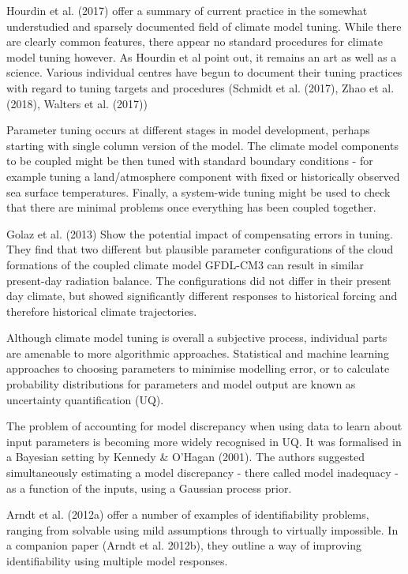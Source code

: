 \documentclass[gmd, manuscript]{copernicus}
\begin{document}
Hourdin et al. (2017) offer a summary of current practice in the somewhat understudied and sparsely documented field of climate model tuning. While there are clearly common features, there appear no standard procedures for climate model tuning however. As Hourdin et al point out, it remains an art as well as a science. Various individual centres have begun to document their tuning practices with regard to tuning targets and procedures (Schmidt et al. (2017), Zhao et al. (2018), Walters et al. (2017))

Parameter tuning occurs at different stages in model development, perhaps starting with single column version of the model. The climate model components to be coupled might be then tuned with standard boundary conditions - for example tuning a land/atmosphere component with fixed or historically observed sea surface temperatures. Finally, a system-wide tuning might be used to check  that there are minimal  problems once everything has been coupled together. 

Golaz et al. (2013) Show the potential impact of compensating errors in tuning. They find that two different but plausible parameter configurations of the cloud formations of the coupled climate model GFDL-CM3 can result in similar present-day radiation balance. The configurations did not differ in their present day climate, but showed significantly different responses to historical forcing and therefore historical climate trajectories.

Although climate model tuning is overall a subjective process, individual parts are amenable to more algorithmic approaches. Statistical and machine learning approaches to choosing parameters to minimise modelling error, or to calculate probability distributions for parameters and model output are known as uncertainty quantification (UQ). 

The problem of accounting for model discrepancy when using data to learn about input parameters is becoming more widely recognised in UQ. It was formalised in a Bayesian setting by Kennedy \& O'Hagan (2001). The authors suggested simultaneously estimating a model discrepancy  - there called model inadequacy - as a function of the inputs, using a Gaussian process prior. 

Arndt et al. (2012a) offer a number of examples of identifiability problems, ranging from solvable using mild assumptions through to virtually impossible. In a companion paper (Arndt et al. 2012b), they outline a way of improving identifiability using multiple model responses.
\end{document}
